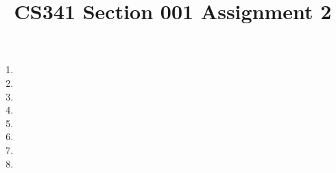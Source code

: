 \documentclass[12pt]{article}
\title{CS341 Section 001 Assignment 2}
\begin{document}
\maketitle
\clearpage

\begin{enumerate}
\item
\item
\item
\item
\item
\item
\item
\item
\end{enumerate}
\end{document}
